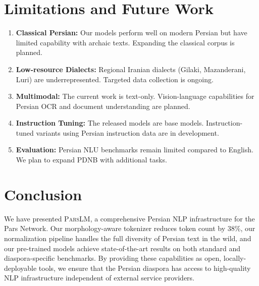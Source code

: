 \documentclass[11pt,a4paper]{article}
\newcommand{\parslm}{\textsc{ParsLM}\xspace}
\begin{document}
\section{Limitations and Future Work}

\begin{enumerate}
    \item \textbf{Classical Persian:} Our models perform well on modern Persian but have limited capability with archaic texts. Expanding the classical corpus is planned.
    \item \textbf{Low-resource Dialects:} Regional Iranian dialects (Gilaki, Mazanderani, Luri) are underrepresented. Targeted data collection is ongoing.
    \item \textbf{Multimodal:} The current work is text-only. Vision-language capabilities for Persian OCR and document understanding are planned.
    \item \textbf{Instruction Tuning:} The released models are base models. Instruction-tuned variants using Persian instruction data are in development.
    \item \textbf{Evaluation:} Persian NLU benchmarks remain limited compared to English. We plan to expand PDNB with additional tasks.
\end{enumerate}

\section{Conclusion}

We have presented \parslm, a comprehensive Persian NLP infrastructure for the Pars Network. Our morphology-aware tokenizer reduces token count by 38\%, our normalization pipeline handles the full diversity of Persian text in the wild, and our pre-trained models achieve state-of-the-art results on both standard and diaspora-specific benchmarks. By providing these capabilities as open, locally-deployable tools, we ensure that the Persian diaspora has access to high-quality NLP infrastructure independent of external service providers.


\end{document}
